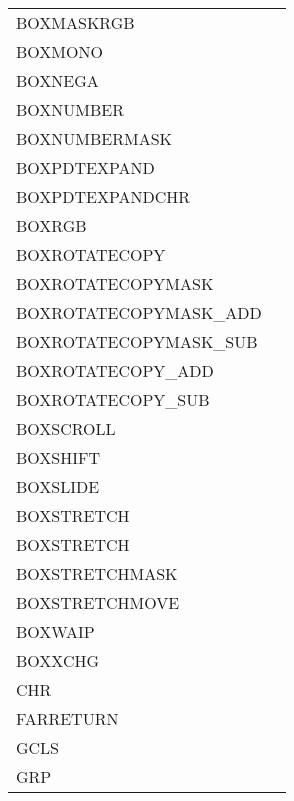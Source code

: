 {\begin{supertabular}{l@{\hs}l}
  BOXMASKRGB                &\\
  BOXMONO                   &               \\
  BOXNEGA                   &             \\
  BOXNUMBER                 &             \\
  BOXNUMBERMASK             &         \\
  BOXPDTEXPAND              &               \\
  BOXPDTEXPANDCHR           &           \\
  BOXRGB                    &             \\
  BOXROTATECOPY             &             \\
  BOXROTATECOPYMASK         &         \\
  BOXROTATECOPYMASK\_ADD    &      \\
  BOXROTATECOPYMASK\_SUB    &      \\
  BOXROTATECOPY\_ADD        &          \\
  BOXROTATECOPY\_SUB        &          \\
  BOXSCROLL                 &                \\
  BOXSHIFT                  &              \\
  BOXSLIDE                  &              \\
  BOXSTRETCH                &     \\
  BOXSTRETCH                &         \\
  BOXSTRETCHMASK            &\\
  BOXSTRETCHMOVE            &               \\
  BOXWAIP                   &\\
  BOXXCHG                   &               \\
  CHR                       &           \\
  FARRETURN                 &                   \\
  GCLS                      &                  \\
  GRP                       &               \\

\end{supertabular}}

